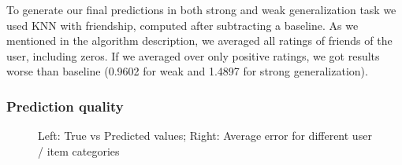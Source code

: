 \documentclass{article} %
\begin{document}


To generate our final predictions in both strong and weak generalization task
we used KNN with friendship, computed after subtracting a baseline. As we
mentioned in the algorithm description, we averaged all ratings of friends of
the user, including zeros. If we averaged over only positive ratings, we
got results worse than baseline (0.9602 for weak and 1.4897 for strong
generalization).


% 

\subsubsection{Prediction quality}

\begin{figure}[!t]
	\center
	\hfill
	\caption{Left: True vs Predicted values; Right: Average error for different
	user / item categories}
\end{figure}
\end{document}
